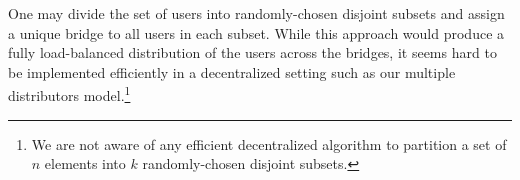 \documentclass{llncs}
\begin{document}

One may divide the set of users into randomly-chosen disjoint subsets and assign a unique bridge to all users in each subset. While this approach would produce a fully load-balanced distribution of the users across the bridges, it seems hard to be implemented efficiently in a decentralized setting such as our multiple distributors model.\footnote{We are not aware of any efficient decentralized algorithm to partition a set of $n$ elements into $k$ randomly-chosen disjoint subsets.}




\end{document}

